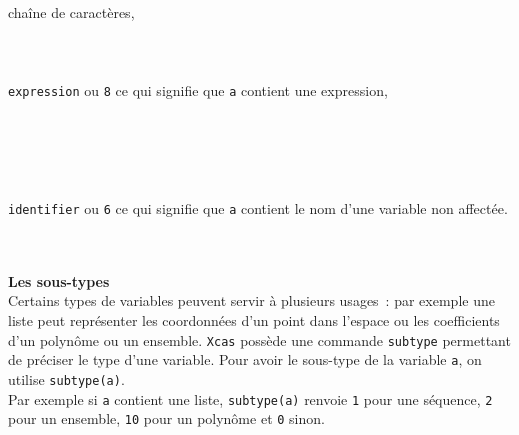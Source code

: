 \documentclass[12pt,a4paper]{book}
\begin{document}
\begin{giacjshere}
cha\^ine de caract\`eres,\\ 
\\
\\
\\
{\tt expression} ou {\tt 8} ce qui signifie que {\tt a} contient une 
expression,\\ 
\\
\\
\\
\\
\\
{\tt identifier} ou {\tt 6} ce qui signifie que {\tt a} contient le nom d'une 
variable non affect\'ee.\\
\\
\\

{\bf Les sous-types}\\
Certains types de variables peuvent servir \`a plusieurs usages~: par exemple
une liste peut repr\'esenter les coordonn\'ees d'un point dans l'espace
ou les coefficients d'un polyn\^ome ou un ensemble. {\tt Xcas} poss\`ede
une commande {\tt subtype} permettant de pr\'eciser le type d'une variable.
Pour avoir le sous-type de la variable {\tt a}, on utilise {\tt subtype(a)}.\\
Par exemple si {\tt a} contient une liste,
{\tt subtype(a)} renvoie {\tt 1} pour une s\'equence, {\tt 2} pour un ensemble, 
{\tt 10} pour un polyn\^ome et {\tt 0} sinon.\\
\\
\\
\\


\end{giacjshere}
\end{document}
